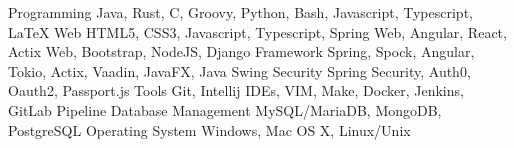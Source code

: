 \begin{cvskills}
    \cvskill
    {Programming}
    {Java, Rust, C, Groovy, Python, Bash, Javascript, Typescript, LaTeX}
    \cvskill
    {Web}
    {HTML5, CSS3, Javascript, Typescript, Spring Web, Angular, React, Actix Web, Bootstrap, NodeJS, Django}
    \cvskill
    {Framework}
    {Spring, Spock, Angular, Tokio, Actix, Vaadin, JavaFX, Java Swing}
    \cvskill
    {Security}
    {Spring Security, Auth0, Oauth2, Passport.js}
    \cvskill
    {Tools}
    {Git, Intellij IDEs, VIM, Make, Docker, Jenkins, GitLab Pipeline}
    \cvskill
    {Database Management}
    {MySQL/MariaDB, MongoDB, PostgreSQL}
    \cvskill
    {Operating System}
    {Windows, Mac OS X, Linux/Unix}
\end{cvskills}
